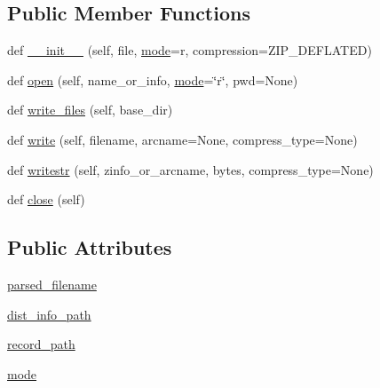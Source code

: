 \subsection*{Public Member Functions}
\begin{DoxyCompactItemize}
\item 
def \hyperlink{classwheel_1_1wheelfile_1_1WheelFile_a8be2bbd1569e6331ab1c87cb22b0d51d}{\+\_\+\+\_\+init\+\_\+\+\_\+} (self, file, \hyperlink{classwheel_1_1wheelfile_1_1WheelFile_acbfa7a81fa0e04a0f238863bdf963a0f}{mode}=\textquotesingle{}r\textquotesingle{}, compression=Z\+I\+P\+\_\+\+D\+E\+F\+L\+A\+T\+ED)
\item 
def \hyperlink{classwheel_1_1wheelfile_1_1WheelFile_a8c405b21a26e338308200dec1df4fbc6}{open} (self, name\+\_\+or\+\_\+info, \hyperlink{classwheel_1_1wheelfile_1_1WheelFile_acbfa7a81fa0e04a0f238863bdf963a0f}{mode}=\char`\"{}r\char`\"{}, pwd=None)
\item 
def \hyperlink{classwheel_1_1wheelfile_1_1WheelFile_a69ab05d387028873a52916edac00b2a8}{write\+\_\+files} (self, base\+\_\+dir)
\item 
def \hyperlink{classwheel_1_1wheelfile_1_1WheelFile_a61b513322e41d8594c516af51402eb04}{write} (self, filename, arcname=None, compress\+\_\+type=None)
\item 
def \hyperlink{classwheel_1_1wheelfile_1_1WheelFile_a0e039e2eb3bd0758f8b8abf2e8c41a7c}{writestr} (self, zinfo\+\_\+or\+\_\+arcname, bytes, compress\+\_\+type=None)
\item 
def \hyperlink{classwheel_1_1wheelfile_1_1WheelFile_a3678e0b5727d2cee940e57f75034014a}{close} (self)
\end{DoxyCompactItemize}
\subsection*{Public Attributes}
\begin{DoxyCompactItemize}
\item 
\hyperlink{classwheel_1_1wheelfile_1_1WheelFile_adb28289ac9470e45ac16ceec1fa609c6}{parsed\+\_\+filename}
\item 
\hyperlink{classwheel_1_1wheelfile_1_1WheelFile_a97e319ea4c4f9ab48695701de6a5c182}{dist\+\_\+info\+\_\+path}
\item 
\hyperlink{classwheel_1_1wheelfile_1_1WheelFile_a754d0dfa1404355d4e62770fdfb3537d}{record\+\_\+path}
\item 
\hyperlink{classwheel_1_1wheelfile_1_1WheelFile_acbfa7a81fa0e04a0f238863bdf963a0f}{mode}
\end{DoxyCompactItemize}


